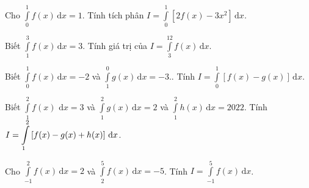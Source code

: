 \begin{ex}%
	Cho $\displaystyle\int\limits_0^1f(x)\mathrm{\,d}x=1$. Tính tích phân $ I=\displaystyle\int\limits_0^1\left[2f(x)-3x^2\right]\mathrm{\,d}x.$\\
\end{ex}

\begin{ex}%
	Biết $\displaystyle\int\limits_1^3f(x)\mathrm{\,d}x=3$. Tính giá trị của $ I=\displaystyle\int\limits_3^12f(x)\mathrm{\,d}x$.\\
\end{ex}

\begin{ex}%
	Biết $\displaystyle\int\limits_0^1f(x)\mathrm{\,d}x=-2$ và $\displaystyle\int\limits_1^0g(x)\mathrm{\,d}x=-3$.. Tính $ I=\displaystyle\int\limits_0^1\left[f(x)-g(x)\right]\mathrm{\,d}x$.\\
\end{ex}

\begin{ex}%
	Biết $\displaystyle\int\limits_1^2f(x)\,\mathrm{\,d}x=3$ và $\displaystyle\int\limits_1^2g(x)\mathrm{\,d}x=2$ và $\displaystyle\int\limits_1^2h(x)\mathrm{\,d}x=2022$. Tính $\linebreak I=\displaystyle\int\limits_1^2\left[f(x)-g(x)+h(x)\right]\mathrm{\,d}x$.\\
\end{ex}

\begin{ex}%
	Cho $\displaystyle\int\limits_{-1}^2f(x)\mathrm{\,d}x=2$ và $\displaystyle\int\limits_2^5f(x)\mathrm{\,d}x=-5$. Tính $ I=\displaystyle\int\limits_{-1}^5f(x)\mathrm{\,d}x$.\\
\end{ex}

